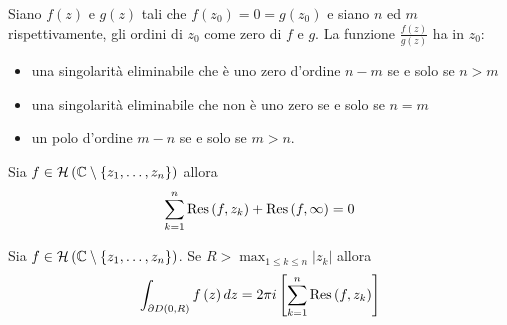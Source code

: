 \begin{thm}
Siano $f(z)$ e $g(z)$ tali che $f\left( z_{0}\right) =0=g\left( z_{0}\right)$ e siano $n$ ed $m$ rispettivamente, gli ordini di $z_{0}$ come zero di $f$ e $g$. La funzione $\frac{f(z)}{g(z)}$ ha in $z_{0}$:

\begin{itemize}
\item una singolarità eliminabile che è uno zero d'ordine $n-m$ se e solo se $n >m$
\item una singolarità eliminabile che non è uno zero se e solo se $n=m$
\item un polo d'ordine $m-n$ se e solo se $m >n$.
\end{itemize}
\end{thm}
\begin{thm}
Sia $f\in \mathcal{H} \left(\mathbb{C}  \setminus \left\{z_{1} ,\dotsc ,z_{n}\right\}\right)$ allora
\begin{equation*}
\sum\limits ^{n}_{k=1}\operatorname{Res} \left( f,z_{k}\right) +\operatorname{Res} \left( f,\infty \right) =0
\end{equation*}
\end{thm}
\begin{thm}
Sia $f\in \mathcal{H} \left(\mathbb{C}  \setminus \left\{z_{1} ,\dotsc ,z_{n}\right\}\right)$. Se $R >\max_{1\leqslant k\leqslant n}\left| z_{k}\right| $ allora
\begin{equation*}
\int\nolimits _{\partial D\left( 0,R\right)} f\left( z\right) dz=2\pi i\left[\sum\limits ^{n}_{k=1}\operatorname{Res} \left( f,z_{k}\right)\right]
\end{equation*}
\end{thm}
